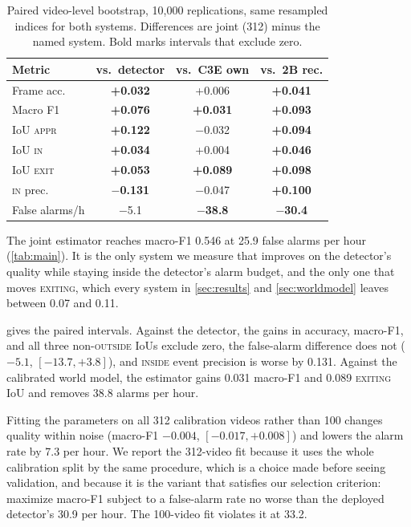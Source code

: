 \documentclass[journal]{IEEEtran}
\newcommand{\st}[1]{\textsc{#1}}
\begin{document}
\begin{table}[t]
\centering
\caption{Paired video-level bootstrap, 10{,}000 replications, same resampled indices for both systems.  Differences are joint (312) minus the named system. Bold marks intervals that exclude zero.}
\label{tab:ci}
\footnotesize
\setlength{\tabcolsep}{3pt}
\begin{tabular}{@{}lccc@{}}
\toprule
Metric & vs.\ detector & vs.\ C3E own & vs.\ 2B rec. \\
\midrule
Frame acc.     & \textbf{+0.032} & +0.006 & \textbf{+0.041} \\
Macro F1       & \textbf{+0.076} & \textbf{+0.031} & \textbf{+0.093} \\
IoU \st{appr}  & \textbf{+0.122} & $-$0.032 & \textbf{+0.094} \\
IoU \st{in}    & \textbf{+0.034} & +0.004 & \textbf{+0.046} \\
IoU \st{exit}  & \textbf{+0.053} & \textbf{+0.089} & \textbf{+0.098} \\
\st{in} prec.  & \textbf{$-$0.131} & $-$0.047 & \textbf{+0.100} \\
False alarms/h & $-$5.1 & \textbf{$-$38.8} & \textbf{$-$30.4} \\
\bottomrule
\end{tabular}
\end{table}

The joint estimator reaches macro-F1 0.546 at 25.9 false alarms per hour (\cref{tab:main}).  It is the only system we measure that improves on the detector's quality while staying inside the detector's alarm budget, and the only one that moves \st{exiting}, which every system in \cref{sec:results} and \cref{sec:worldmodel} leaves between 0.07 and 0.11.

 gives the paired intervals.  Against the detector, the gains in accuracy, macro-F1, and all three non-\st{outside} IoUs exclude zero, the false-alarm difference does not ($-5.1$, $[-13.7, +3.8]$), and \st{inside} event precision is worse by 0.131.  Against the calibrated world model, the estimator gains 0.031 macro-F1 and 0.089 \st{exiting} IoU and removes 38.8 alarms per hour.

Fitting the parameters on all 312 calibration videos rather than 100 changes quality within noise (macro-F1 $-0.004$, $[-0.017, +0.008]$) and lowers the alarm rate by 7.3 per hour.  We report the 312-video fit because it uses the whole calibration split by the same procedure, which is a choice made before seeing validation, and because it is the variant that satisfies our selection criterion: maximize macro-F1 subject to a false-alarm rate no worse than the deployed detector's 30.9 per hour.  The 100-video fit violates it at 33.2.
\end{document}
